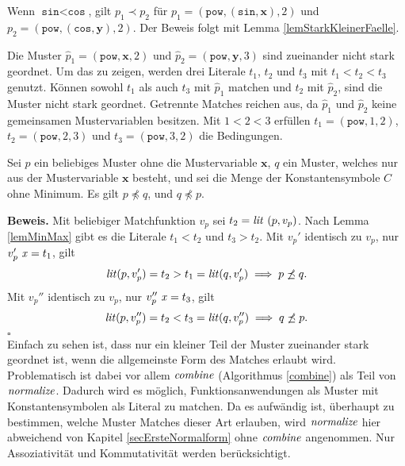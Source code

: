 \begin{beispiel}
Wenn $\texttt{sin} < \texttt{cos}$, gilt $p_1 \prec p_2$ für $p_1 = (\texttt{pow}, (\texttt{sin}, \mathbf x), 2)$ und $p_2 = (\texttt{pow}, (\texttt{cos}, \mathbf y), 2)$. Der Beweis folgt mit Lemma \ref{lemStarkKleinerFaelle}.

Die Muster $\hat p_1 = (\texttt{pow}, \mathbf x, 2)$ und $\hat p_2 = (\texttt{pow}, \mathbf y, 3)$ sind zueinander nicht stark geordnet. 
Um das zu zeigen, werden drei Literale $t_1$, $t_2$ und $t_3$ mit ${t_1 < t_2 < t_3}$ genutzt.
Können sowohl $t_1$ als auch $t_3$ mit $\hat p_1$ matchen und $t_2$ mit $\hat p_2$, sind die Muster nicht stark geordnet. Getrennte Matches reichen aus, da $\hat p_1$ und $\hat p_2$ keine gemeinsamen Mustervariablen besitzen.
 Mit $1 < 2 < 3$ erfüllen $t_1 = (\texttt{pow}, 1, 2)$, $t_2 = (\texttt{pow}, 2, 3)$ und $t_3 = (\texttt{pow}, 3, 2)$ die Bedingungen.
\end{beispiel}

\begin{lemma}
Sei $p$ ein beliebiges Muster ohne die Mustervariable $\mathbf x$, $q$ ein Muster, welches nur aus der Mustervariable $\mathbf x$ besteht, und sei die Menge der Konstantensymbole $C$ ohne Minimum.
Es gilt $p \not\preceq q$, und $q \not\preceq p$.
\end{lemma}

\textbf{Beweis.}
Mit beliebiger Matchfunktion $v_p$ sei $t_2 = \mathit{lit}~(p, v_p)$. Nach Lemma \ref{lemMinMax} gibt es die Literale $t_1 < t_2$ und $t_3 > t_2$. 
Mit $v_p'$ identisch zu $v_p$, nur $v_p'~\mathit{x} = t_1$, gilt 
$$\mathit{lit}(p, v_p') = t_2 > t_1 = \mathit{lit}(q, v_p') \implies p \not\preceq q.$$
Mit $v_p''$ identisch zu $v_p$, nur $v_p''~\mathit{x} = t_3$, gilt 
$$\mathit{lit}(p, v_p'') = t_2 < t_3 = \mathit{lit}(q, v_p'') \implies q \not\preceq p.$$
\hfill $\square$\\


Einfach zu sehen ist, dass nur ein kleiner Teil der Muster zueinander stark geordnet ist, wenn die allgemeinste Form des Matches erlaubt wird. Problematisch ist dabei vor allem $\mathit{combine}$ (Algorithmus \ref{combine}) als Teil von $\mathit{normalize}$. Dadurch wird es möglich, Funktionsanwendungen als Muster mit Konstantensymbolen als Literal zu matchen. Da es aufwändig ist, überhaupt zu bestimmen, welche Muster Matches dieser Art erlauben, wird $\mathit{normalize}$ hier abweichend von Kapitel \ref{secErsteNormalform} ohne $\mathit{combine}$ angenommen. Nur Assoziativität und Kommutativität werden berücksichtigt.

